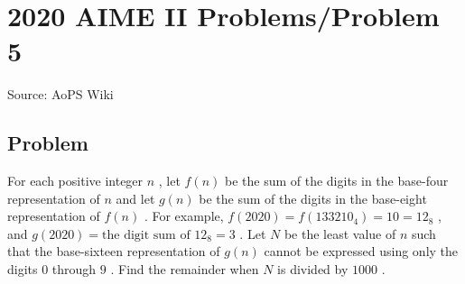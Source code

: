 \documentclass[12pt]{article}
\begin{document}
\section*{{2020 AIME II Problems/Problem 5}}
Source: AoPS Wiki

\subsection*{Problem}
For each positive integer $n$ , let $f(n)$ be the sum of the digits in the base-four representation of $n$ and let $g(n)$ be the sum of the digits in the base-eight representation of $f(n)$ . For example, $f(2020) = f(133210_{\text{4}}) = 10 = 12_{\text{8}}$ , and $g(2020) = \text{the digit sum of }12_{\text{8}} = 3$ . Let $N$ be the least value of $n$ such that the base-sixteen representation of $g(n)$ cannot be expressed using only the digits $0$ through $9$ . Find the remainder when $N$ is divided by $1000$ .
\end{document}
